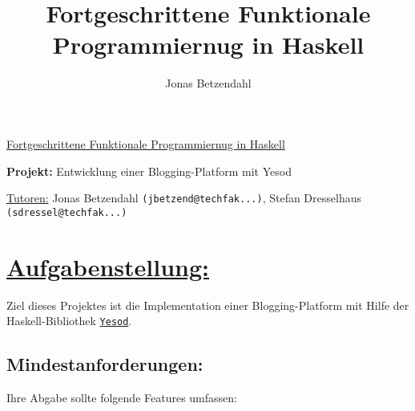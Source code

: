 \documentclass[10pt,a4paper]{article}
\author{Jonas Betzendahl}
\title{Fortgeschrittene Funktionale Programmiernug in Haskell}
\begin{document}
\huge \underline{Fortgeschrittene Funktionale Programmiernug in Haskell}\smallskip

\Large
\begin{center}
\textbf{Projekt:} Entwicklung einer Blogging-Platform mit Yesod\bigskip

\normalsize
\underline{Tutoren:}
Jonas Betzendahl \texttt{(jbetzend@techfak...)},
Stefan Dresselhaus \texttt{(sdressel@techfak...)}
\end{center}
\normalsize

\section*{\underline{Aufgabenstellung:}}

Ziel dieses Projektes ist die Implementation einer Blogging-Platform mit Hilfe der Haskell-Bibliothek \href{http://www.yesodweb.com/}{\texttt{Yesod}}.

\subsection*{Mindestanforderungen:}

Ihre Abgabe sollte folgende Features umfassen:
\end{document}
